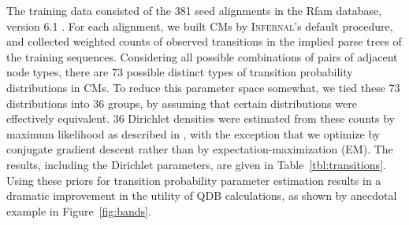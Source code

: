 \documentclass[11pt]{article}
\begin{document}
The training data consisted of the 381 seed alignments in the Rfam
database, version 6.1 \cite{Griffiths-Jones05}. For each alignment, we
built CMs by \textsc{Infernal}'s default procedure, and collected
weighted counts of observed transitions in the implied parse trees of
the training sequences. Considering all possible combinations of pairs
of adjacent node types, there are 73 possible distinct types of
transition probability distributions in CMs. To reduce this parameter
space somewhat, we tied these 73 distributions into 36 groups, by
assuming that certain distributions were effectively equivalent.  36
Dirichlet densities were estimated from these counts by maximum
likelihood as described in \cite{Sjolander96}, with the exception that
we optimize by conjugate gradient descent \cite{Press93} rather than
by expectation-maximization (EM).  The results, including the
Dirichlet parameters, are given in Table~\ref{tbl:transitions}.  Using
these priors for transition probability parameter estimation results
in a dramatic improvement in the utility of QDB calculations, as shown
by anecdotal example in Figure~\ref{fig:bands}.
\end{document}
